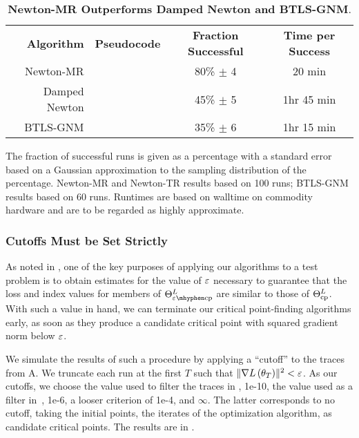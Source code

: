 \documentclass[../../thesis.tex]{subfiles}
\begin{document}
\begin{table}[h]
	\begin{center}
	\begin{tabular}{rccc}
\textbf{Algorithm} & \textbf{Pseudocode} & \textbf{Fraction Successful} & \textbf{Time per Success} \\
		Newton-MR & \algoref{nmr} & 80\% $\pm$ 4 & 20 min\\
		Damped Newton & \algoref{damped-newton} & 45\% $\pm$ 5 & 1hr 45 min\\
		BTLS-GNM & \algoref{gnm}\footnotemark & 35\% $\pm$ 6 & 1hr 15 min
	\end{tabular}
	\end{center}
	\caption{\textbf{Newton-MR Outperforms Damped Newton and BTLS-GNM}.}{%
		The fraction of successful runs is given as a percentage with a
		standard error based on a Gaussian approximation
		to the sampling distribution of the percentage.
		Newton-MR and Newton-TR results based on 100 runs;
		BTLS-GNM results based on 60 runs.
		Runtimes are based on walltime on commodity hardware
		and are to be regarded as highly approximate.
	}
\end{table}

\subsubsection{Cutoffs Must be Set Strictly}%

As noted in ,
one of the key purposes of applying our algorithms
to a test problem is to obtain estimates for the value
of $\varepsilon$ necessary to guarantee that the loss and index values
for members of $\Theta^L_{\ecp}$
are similar to those of $\Theta^L_{\mathrm{cp}}$.
With such a value in hand,
we can terminate our critical point-finding algorithms early,
as soon as they produce a candidate critical point with
squared gradient norm below $\varepsilon$.

We simulate the results of such a procedure
by applying a \enquote{cutoff}
to the traces from A.
We truncate each run at the first $T$ such that
$\lVert\nabla L\left(\theta_T\right)\rVert^2 < \varepsilon$.
As our cutoffs,
we choose the value used to filter the traces in
, 1e-10,
the value used as a filter in~\cite{pennington2017}, 1e-6,
a looser criterion of 1e-4,
and $\infty$.
The latter corresponds to no cutoff,
taking the initial points,
the iterates of the optimization algorithm,
as candidate critical points.
The results are in .
\end{document}
